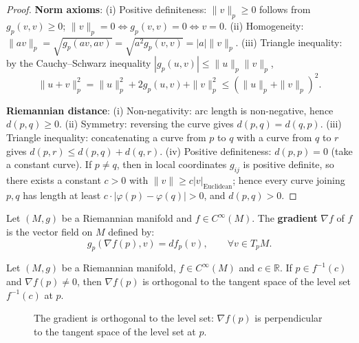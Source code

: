 \begin{proof}
\textbf{Norm axioms}: (i) Positive definiteness: $\|v\|_p \ge 0$ follows from $g_p(v,v) \ge 0$; $\|v\|_p = 0 \iff g_p(v,v) = 0 \iff v = 0$. (ii) Homogeneity: $\|av\|_p = \sqrt{g_p(av,av)} = \sqrt{a^2 g_p(v,v)} = |a|\|v\|_p$. (iii) Triangle inequality: by the Cauchy--Schwarz inequality $|g_p(u,v)| \le \|u\|_p \|v\|_p$,
\[
\|u+v\|_p^2 = \|u\|_p^2 + 2g_p(u,v) + \|v\|_p^2 \le (\|u\|_p + \|v\|_p)^2.
\]

\textbf{Riemannian distance}: (i) Non-negativity: arc length is non-negative, hence $d(p,q)\ge0$. (ii) Symmetry: reversing the curve gives $d(p,q) = d(q,p)$. (iii) Triangle inequality: concatenating a curve from $p$ to $q$ with a curve from $q$ to $r$ gives $d(p,r) \le d(p,q) + d(q,r)$. (iv) Positive definiteness: $d(p,p) = 0$ (take a constant curve). If $p \neq q$, then in local coordinates $g_{ij}$ is positive definite, so there exists a constant $c > 0$ with $\|v\| \ge c |v|_{\text{Euclidean}}$; hence every curve joining $p, q$ has length at least $c \cdot |\varphi(p) - \varphi(q)| > 0$, and $d(p,q) > 0$.
\end{proof}

\begin{definition}\label{def:riemannian_gradient}
Let $(M, g)$ be a Riemannian manifold and $f \in C^\infty(M)$. The \textbf{gradient} $\nabla f$ of $f$ is the vector field on $M$ defined by:
\[
g_p(\nabla f(p), v) = df_p(v), \qquad \forall v \in T_pM.
\]
\end{definition}

\begin{proposition}\label{prop:gradient_orthogonal_levelset}
Let $(M,g)$ be a Riemannian manifold, $f \in C^\infty(M)$ and $c \in \mathbb{R}$. If $p \in f^{-1}(c)$ and $\nabla f(p) \neq 0$, then $\nabla f(p)$ is orthogonal to the tangent space of the level set $f^{-1}(c)$ at $p$.
\end{proposition}

\begin{figure}[htbp]
\centering
{}
\caption{The gradient is orthogonal to the level set: $\nabla f(p)$ is perpendicular to the tangent space of the level set at $p$.}
\label{fig:gradient_levelset}
\end{figure}

